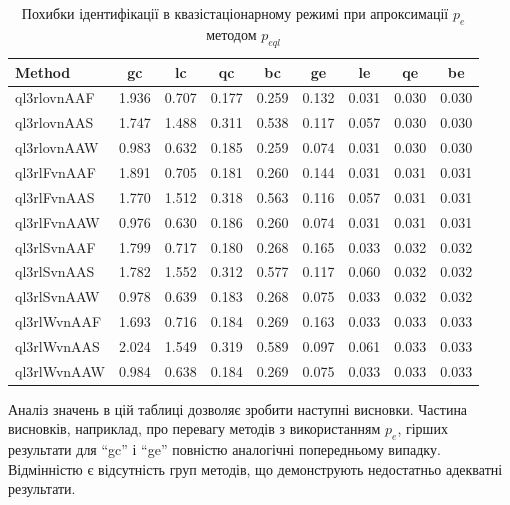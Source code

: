 \begin{table}[htb!]
  \caption{Похибки ідентифікації в квазістаціонарному режимі при апроксимації $p_e$ методом $p_{eql}$}
  \label{atu:t:err_test_id_ql}
  \begin{center}
    \begin{tabular}{|l|c|c|c|c|c|c|c|c|}
    \hline
    Method      & gc    & lc    & qc    & bc    & ge     & le    & qe    & be    \\ \hline
    ql3rlovnAAF & 1.936 & 0.707 & 0.177 & 0.259 & 0.132  & 0.031 & 0.030 & 0.030 \\ \hline
    ql3rlovnAAS & 1.747 & 1.488 & 0.311 & 0.538 & 0.117  & 0.057 & 0.030 & 0.030 \\ \hline
    ql3rlovnAAW & 0.983 & 0.632 & 0.185 & 0.259 & 0.074  & 0.031 & 0.030 & 0.030 \\ \hline
    ql3rlFvnAAF & 1.891 & 0.705 & 0.181 & 0.260 & 0.144  & 0.031 & 0.031 & 0.031 \\ \hline
    ql3rlFvnAAS & 1.770 & 1.512 & 0.318 & 0.563 & 0.116  & 0.057 & 0.031 & 0.031 \\ \hline
    ql3rlFvnAAW & 0.976 & 0.630 & 0.186 & 0.260 & 0.074  & 0.031 & 0.031 & 0.031 \\ \hline
    ql3rlSvnAAF & 1.799 & 0.717 & 0.180 & 0.268 & 0.165  & 0.033 & 0.032 & 0.032 \\ \hline
    ql3rlSvnAAS & 1.782 & 1.552 & 0.312 & 0.577 & 0.117  & 0.060 & 0.032 & 0.032 \\ \hline
    ql3rlSvnAAW & 0.978 & 0.639 & 0.183 & 0.268 & 0.075  & 0.033 & 0.032 & 0.032 \\ \hline
    ql3rlWvnAAF & 1.693 & 0.716 & 0.184 & 0.269 & 0.163  & 0.033 & 0.033 & 0.033 \\ \hline
    ql3rlWvnAAS & 2.024 & 1.549 & 0.319 & 0.589 & 0.097  & 0.061 & 0.033 & 0.033 \\ \hline
    ql3rlWvnAAW & 0.984 & 0.638 & 0.184 & 0.269 & 0.075  & 0.033 & 0.033 & 0.033 \\ \hline
    \end{tabular}
  \end{center}
\end{table}


Аналіз значень в цій таблиці дозволяє зробити наступні
висновки. Частина висновків, наприклад, про перевагу методів з використанням
$p_e$, гірших результати для ``gc'' і ``ge'' повністю аналогічні
попередньому випадку. Відмінністю є відсутність груп методів,
що демонструють недостатньо адекватні результати.

